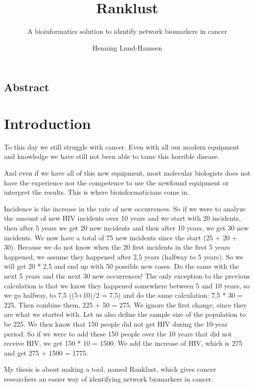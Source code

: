 \documentclass[UKenglish,11pt,a4paper]{article}
\title{Ranklust}
\subtitle{A bioinformatics solution to identify network biomarkers in cancer}
\author{Henning Lund-Hanssen}
\begin{document}
\ififorside{}
\frontmatter{}

\tableofcontents{}
\listoffigures{}
\listoftables{}

\chapter*{Abstract}

\mainmatter{}

\part{Introduction}
To this day we still struggle with cancer. Even with all our modern equipment and knowledge we have still not been able
to tame this horrible disease. 

And even if we have all of this new equipment, most molecular biologists does not have the experience nor the competence
to use the newfound equipment or interpret the results. This is where bioinformaticians come in. 

Incidence is the increase in the rate of new occurrences. So if we were to
analyze the amount of new HIV incidents over 10 years and we start with 20 incidents, then after
5 years we get 20 new incidents and then after 10 years, we get 30 new
incidents. We now have a total of 75 new incidents since the start (25 + 20 + 30).
Because we do not know when the 20 first incidents in the first 5 years
happened, we assume they happened after 2,5 years (halfway to 5 years). So we
will get 20 * 2,5 and end up with 50 possible new cases. Do the same with the
next 5 years and the next 30 new occurrences! The only exception to the previous
calculation is that we know they happened somewhere between 5 and 10 years, so
we go halfway, to 7,5 ((5+10)/2 = 7,5) and do the same calculation:
7,5 * 30 = 225. Then combine them, 225 + 50 = 275. We ignore the first change,
since they are what we started with. Let us also define the sample size of the
population to be 225. We then know that 150 people did not get HIV during the
10-year period. So if we were to add these 150 people over the 10 years that did
not receive HIV, we get 150 * 10 = 1500. We add the increase of HIV, which is
275 and get 275 + 1500 = 1775. 

My thesis is about making a tool, named Ranklust, which gives cancer researchers an
easier way of identifying network biomarkers in cancer. 
\end{document}
